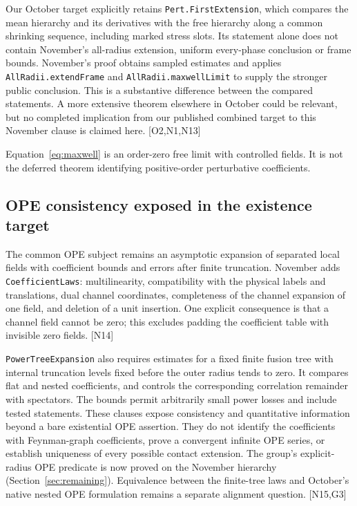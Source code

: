\documentclass[11pt]{article}
\newcommand{\code}[1]{{\small\nolinkurl{#1}}}
\newcommand{\src}[1]{\textsf{[#1]}}
\begin{document}
Our October target explicitly retains \code{Pert.FirstExtension}, which
compares the mean hierarchy and its derivatives with the free hierarchy
along a common shrinking sequence, including marked stress slots. Its
statement alone does not contain November's all-radius extension, uniform
every-phase conclusion or frame bounds. November's proof obtains sampled
estimates and applies \code{AllRadii.extendFrame} and
\code{AllRadii.maxwellLimit} to supply the stronger public conclusion.
This is a substantive difference between the compared statements. A more
extensive theorem elsewhere in October could be relevant, but no completed
implication from our published combined target to this November clause is
claimed here. \src{O2,N1,N13}

Equation~\eqref{eq:maxwell} is an order-zero free limit with controlled
fields. It is not the deferred theorem identifying positive-order
perturbative coefficients.

\subsection{OPE consistency exposed in the existence target}

The common OPE subject remains an asymptotic expansion of separated local
fields with coefficient bounds and errors after finite truncation.
November adds \code{CoefficientLaws}: multilinearity, compatibility with
the physical labels and translations, dual channel coordinates, completeness
of the channel expansion of one field, and deletion of a unit insertion.
One explicit consequence is that a channel field cannot be zero; this
excludes padding the coefficient table with invisible zero fields. \src{N14}

\code{PowerTreeExpansion} also requires estimates for a fixed finite fusion
tree with internal truncation levels fixed before the outer radius tends
to zero. It compares flat and nested coefficients, and controls the
corresponding correlation remainder with spectators. The bounds permit
arbitrarily small power losses and include tested statements. These clauses
expose consistency and quantitative information beyond a bare existential
OPE assertion. They do not identify the coefficients with Feynman-graph
coefficients, prove a convergent infinite OPE series, or establish uniqueness
of every possible contact extension. The group's explicit-radius OPE
predicate is now proved on the November hierarchy (Section~\ref{sec:remaining}).
Equivalence between the finite-tree laws and October's native nested OPE
formulation remains a separate alignment question. \src{N15,G3}
\end{document}
